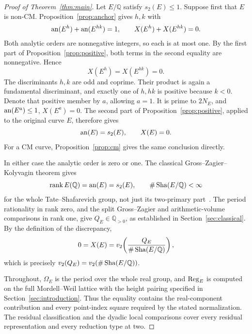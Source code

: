 \begin{proof}[Proof of Theorem~\ref{thm:main}]
Let \(E/\mathbb Q\) satisfy \(s_2(E)\le1\).  Suppose first that
\(E\) is non-CM.  Proposition~\ref{prop:anchor} gives \(h,k\) with
\[
 \operatorname{an}(E^h)+\operatorname{an}(E^{hk})=1,
 \qquad X(E^h)+X(E^{hk})=0.
\]
Both analytic orders are nonnegative integers, so each is at most
one.  By the first part of Proposition~\ref{prop:positive}, both
terms in the second equality are nonnegative.  Hence
\[
 X(E^h)=X(E^{hk})=0.
\]
The discriminants \(h,k\) are odd and coprime.  Their product is
again a fundamental discriminant, and exactly one of \(h,hk\) is
positive because \(k<0\).  Denote that positive member by \(a\),
allowing \(a=1\).  It is prime to \(2N_E\), and
\(\operatorname{an}(E^a)\le1\), \(X(E^a)=0\).  The second part of
Proposition~\ref{prop:positive}, applied to the original curve \(E\),
therefore gives
\[
 \operatorname{an}(E)=s_2(E),\qquad X(E)=0.
\]
For a CM curve, Proposition~\ref{prop:cm} gives the same conclusion
directly.

In either case the analytic order is zero or one.  The classical
Gross--Zagier--Kolyvagin theorem gives
\[
 \operatorname{rank}E(\mathbb Q)=\operatorname{an}(E)=s_2(E),
 \qquad \#\operatorname{Sha}(E/\mathbb Q)<\infty
\]
for the whole Tate--Shafarevich group, not just its two-primary
part~\cite{GZ86,Kolyvagin90}.  The period rationality in rank zero,
and the split Gross--Zagier and arithmetic-volume comparisons in rank
one, give \(Q_E\in\mathbb Q_{>0}\), as established in
Section~\ref{sec:classical}.  By the definition of the discrepancy,
\[
 0=X(E)=v_2\!\left(\frac{Q_E}{\#\operatorname{Sha}(E/\mathbb Q)}\right),
\]
which is precisely
\(v_2(Q_E)=v_2(\#\operatorname{Sha}(E/\mathbb Q))\).

Throughout, \(\Omega_E\) is the period over the whole real group,
and \(\operatorname{Reg}_E\) is computed on the full Mordell--Weil lattice with
the height pairing specified in Section~\ref{sec:introduction}.  Thus the equality
contains the real-component contribution and every point-index
square required by the stated normalization.  The residual
classification and the dyadic local comparisons cover every residual
representation and every reduction type at two.
\end{proof}


